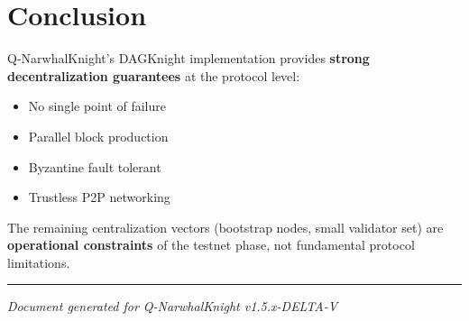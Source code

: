 \documentclass[a5paper,11pt]{article}
\begin{document}
\section{Conclusion}

Q-NarwhalKnight's DAGKnight implementation provides \textbf{strong decentralization guarantees} at the protocol level:

\begin{itemize}
    \item No single point of failure
    \item Parallel block production
    \item Byzantine fault tolerant
    \item Trustless P2P networking
\end{itemize}

The remaining centralization vectors (bootstrap nodes, small validator set) are \textbf{operational constraints} of the testnet phase, not fundamental protocol limitations.

\vspace{0.5cm}
\hrule
\vspace{0.3cm}
\noindent\textit{Document generated for Q-NarwhalKnight v1.5.x-DELTA-V}
\end{document}

